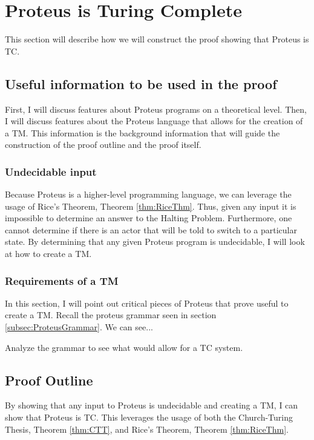 \chapter{Proteus is Turing Complete}\label{chapter:ProteusTC}

This section will describe how we will construct the proof showing that Proteus is TC.

\section{Useful information to be used in the proof}

First, I will discuss features about Proteus programs on a theoretical level.
Then, I will discuss features about the Proteus language that allows for the creation of a TM.
This information is the background information that will guide the construction of the proof outline and the proof itself.

\subsection{Undecidable input}

Because Proteus is a higher-level programming language, we can leverage the usage of Rice's Theorem, Theorem \ref{thm:RiceThm}.
Thus, given any input it is impossible to determine an answer to the Halting Problem.
Furthermore, one cannot determine if there is an actor that will be told to switch to a particular state.
By determining that any given Proteus program is undecidable, I will look at how to create a TM.

\subsection{Requirements of a TM}

In this section, I will point out critical pieces of Proteus that prove useful to create a TM.
Recall the proteus grammar seen in section \ref{subsec:ProteusGrammar}.
We can see...

Analyze the grammar to see what would allow for a TC system.

\section{Proof Outline}

By showing that any input to Proteus is undecidable and creating a TM, I can show that Proteus is TC.
This leverages the usage of both the Church-Turing Thesis, Theorem \ref{thm:CTT}, and Rice's Theorem, Theorem \ref{thm:RiceThm}.


